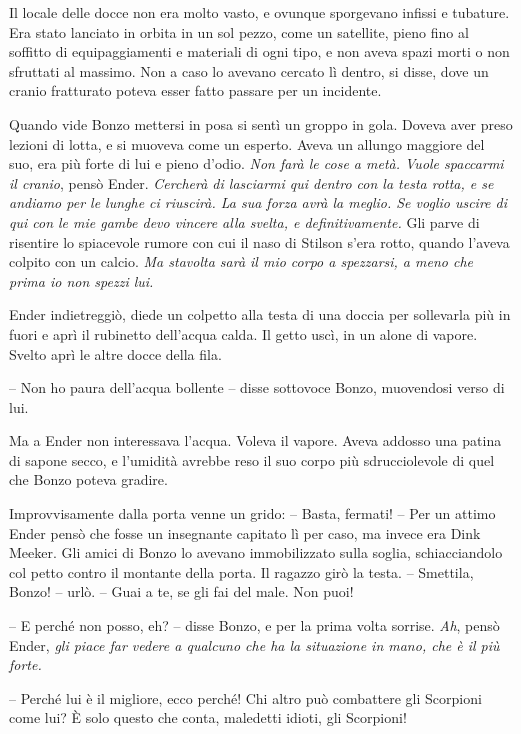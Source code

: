 {Il locale delle docce non era molto vasto, e ovunque sporgevano infissi
	e tubature. Era stato lanciato in orbita in un sol pezzo, come un
	satellite, pieno fino al soffitto di equipaggiamenti e materiali di ogni
	tipo, e non aveva spazi morti o non sfruttati al massimo. Non a caso lo
	avevano cercato lì dentro, si disse, dove un cranio fratturato poteva
	esser fatto passare per un incidente.}

{Quando vide Bonzo mettersi in posa si sentì un groppo in gola. Doveva
	aver preso lezioni di lotta, e si muoveva come un esperto. Aveva un
	allungo maggiore del suo, era più forte di lui e pieno d'odio. \emph{Non
		farà le cose a metà. Vuole spaccarmi il cranio}, \emph{} pensò Ender.
	\emph{Cercherà di lasciarmi qui dentro con la testa rotta, e se andiamo
		per le lunghe ci riuscirà. La sua forza avrà la meglio. Se voglio uscire
		di qui con le mie gambe devo vincere alla svelta, e definitivamente.}
	Gli parve di risentire lo spiacevole rumore con cui il naso di Stilson
	s'era rotto, quando l'aveva colpito con un calcio. \emph{Ma stavolta
		sarà il mio corpo a spezzarsi, a meno che prima io non spezzi lui.}}

{Ender indietreggiò, diede un colpetto alla testa di una doccia per
	sollevarla più in fuori e aprì il rubinetto dell'acqua calda. Il getto
	uscì, in un alone di vapore. Svelto aprì le altre docce della fila.}

{-- Non ho paura dell'acqua bollente -- disse sottovoce Bonzo,
	muovendosi verso di lui.}

{Ma a Ender non interessava l'acqua. Voleva il vapore. Aveva addosso una
	patina di sapone secco, e l'umidità avrebbe reso il suo corpo più
	sdrucciolevole di quel che Bonzo poteva gradire.}

{Improvvisamente dalla porta venne un grido: -- Basta, fermati! -- Per
	un attimo Ender pensò che fosse un insegnante capitato lì per caso, ma
	invece era Dink Meeker. Gli amici di Bonzo lo avevano immobilizzato
	sulla soglia, schiacciandolo col petto contro il montante della porta.
	Il ragazzo girò la testa. -- Smettila, Bonzo! -- urlò. -- Guai a te, se
	gli fai del male. Non puoi!}

{-- E perché non posso, eh? -- disse Bonzo, e per la prima volta
	sorrise. \emph{Ah}, \emph{} pensò Ender, \emph{gli piace far vedere a
		qualcuno che ha la situazione in mano, che è il più forte.}}

{-- Perché lui è il migliore, ecco perché! Chi altro può combattere gli
	Scorpioni come lui? È solo questo che conta, maledetti idioti, gli
	Scorpioni!}

